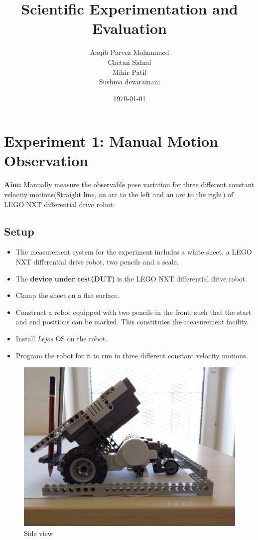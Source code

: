 \documentclass[11pt,a4paper]{article}
\begin{document}
\title{\textbf{Scientific Experimentation and Evaluation}}
\author{Aaqib Parvez Mohammed \\ Chetan Sidnal\\ Mihir Patil \\ Sushma devaramani}
\date{\today}
\maketitle
\newpage
\tableofcontents
\newpage
\listoffigures
\newpage
\section{Experiment 1: Manual Motion Observation}
\textbf{Aim:} Manually measure the observable pose variation for three different constant velocity motions(Straight line, an arc to the left and an arc to the right) of LEGO NXT differential drive robot.

\subsection{\textbf{Setup}}
\begin{itemize}
\item The measurement system for the experiment includes a white sheet, a LEGO NXT differential drive robot, two pencils and a scale.
\item The \textbf{device under test(DUT)} is the LEGO NXT differential drive robot.
\item Clamp the sheet on a flat surface.
\item Construct a robot equipped with two pencils in the front, such that the start and end positions can be marked. This constitutes the measurement facility.
\item Install \textit{Lejos} OS on the robot.
\item Program the robot for it to run in three different constant velocity motions.
\end{itemize}

\begin{figure}[H]
\centering
  \centering
  \includegraphics[width=0.8\linewidth]{1}
  \caption{Side view}
  \label{fig:side}
\end{figure}
\end{document}
